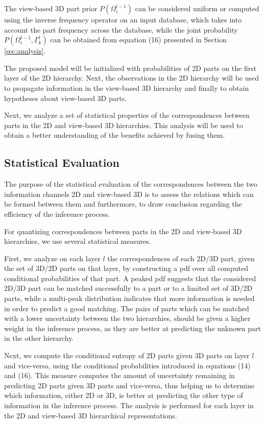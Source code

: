 \documentclass[runningheads]{llncs}
\begin{document}
The view-based 3D part prior $P(\Omega_i^{l-1})$ can be considered uniform or computed using the inverse frequency operator on an input database, which takes into account the part frequency across the database, while the joint probability $P(\Omega_i^{l-1},\Gamma_k^l)$ can be obtained from equation (16) presented in Section \ref{sec:analysis}.

The proposed model will be initialized with probabilities of 2D parts on the first layer of the 2D hierarchy. Next, the observations in the 2D hierarchy will be used to propagate information in the view-based 3D hierarchy and finally to obtain hypotheses about view-based 3D parts. 

Next, we analyze a set of statistical properties of the correspondences between parts in the 2D and view-based 3D hierarchies. This analysis will be used to obtain a better understanding of the benefits achieved by fusing them.

\subsection{Statistical Evaluation}
\label{sec:statistical}

The purpose of the statistical evaluation of the correspondences between the two information channels 2D and view-based 3D is to assess the relations which can be formed between them and furthermore, to draw conclusion regarding the efficiency of the inference process. 

For quantizing correspondences between parts in the 2D and view-based 3D hierarchies, we use several statistical measures.

First, we analyze on each layer $l$ the correspondences of each 2D/3D part, given the set of 3D/2D parts on that layer, by constructing a pdf over all computed conditional probabilities of that part. A peaked pdf suggests that the considered 2D/3D part can be matched successfully to a part or to a limited set of 3D/2D parts, while a multi-peak distribution indicates that more information is needed in order to predict a good matching. The pairs of parts which can be matched with a lower uncertainty between the two hierarchies, should be given a higher weight in the inference process, as they are better at predicting the unknown part in the other hierarchy.

Next, we compute the conditional entropy of 2D parts given 3D parts on layer $l$ and vice-versa, using the conditional probabilities introduced in equations (14) and (16). This measure computes the amount of uncertainty remaining in predicting 2D parts given 3D parts and vice-versa, thus helping us to determine which information, either 2D or 3D, is better at predicting the other type of information in the inference process. The analysis is performed for each layer in the 2D and view-based 3D hierarchical representations.
\end{document}
